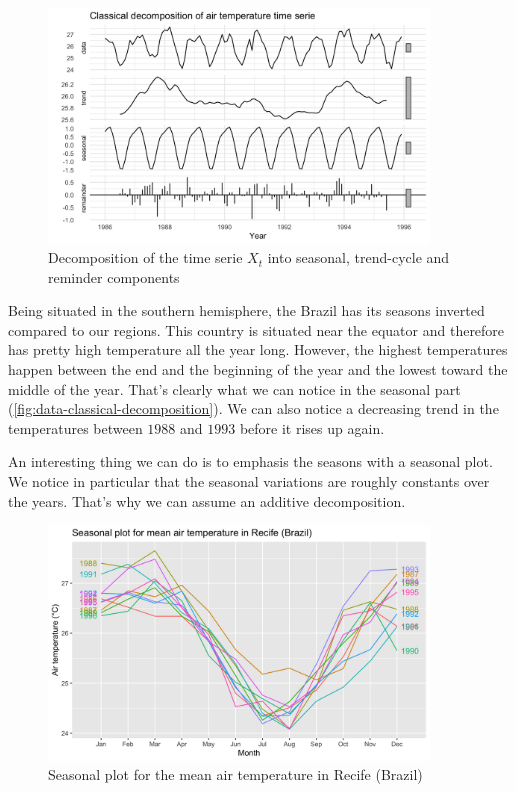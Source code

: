 \begin{figure}[H]
	\centering
	\includegraphics[width=0.9\textwidth]{figures/basic_analysis/time_serie_decomposition.png}
	\caption{Decomposition of the time serie $X_t$ into seasonal, trend-cycle and reminder components}
	\label{fig:data-classical-decomposition}
\end{figure}

Being situated in the southern hemisphere, the Brazil has its seasons inverted compared to our regions. 
This country is situated near the equator and therefore has pretty high temperature all the year long. However, the highest temperatures happen between the end and the beginning of the year and the lowest toward the middle of the year. That's clearly what we can notice in the seasonal part (\autoref{fig:data-classical-decomposition}). We can also notice a decreasing trend in the temperatures between $1988$ and $1993$ before it rises up again.

An interesting thing we can do is to emphasis the seasons with a seasonal plot. We notice in particular that the seasonal variations are roughly constants over the years. That's why we can assume an additive decomposition.

\begin{figure}[H]
	\centering
	\includegraphics[width=0.9\textwidth]{figures/basic_analysis/time_serie_seasonal_plot.png}
	\caption{Seasonal plot for the mean air temperature in Recife (Brazil)}
	\label{fig:seasonal-plot}
\end{figure}